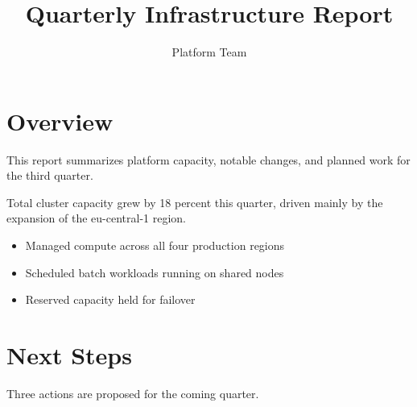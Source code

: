 \documentclass{article}
\title{Quarterly Infrastructure Report}
\author{Platform Team}
\begin{document}
\maketitle

\section{Overview}

This report summarizes platform capacity, notable changes, and planned
work for the third quarter.

Total cluster capacity grew by 18 percent this quarter, driven mainly
by the expansion of the eu-central-1 region.

\begin{itemize}
  \item Managed compute across all four production regions
  \item Scheduled batch workloads running on shared nodes
  \item Reserved capacity held for failover
\end{itemize}

\section{Next Steps}

Three actions are proposed for the coming quarter.
\end{document}
